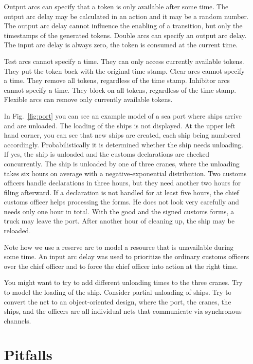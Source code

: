 Output arcs can specify that a token is only available
after some time. The output arc delay may be calculated in an action
and it may be a random number. The output arc delay cannot influence
the enabling of a transition, but only the timestamps of the
generated tokens.
Double arcs can specify an output arc delay. The input arc
delay is always zero, the token is consumed at the
current time.

Test arcs cannot specify a time. They can only access currently
available tokens. They put the token back with the original time stamp.
Clear arcs cannot specify a time. They remove all tokens,
regardless of the time stamp.
Inhibitor arcs cannot specify a time. They block on all tokens,
regardless of the time stamp.
Flexible arcs can remove only currently available tokens.


In Fig.~\ref{fig:port} you can see an example model of a
sea port where ships arrive and are unloaded. The loading of the
ships is not displayed. At the upper left hand corner, you can see
that new ships are created, each ship being numbered accordingly.
Probabilistically it is determined whether the ship needs unloading.
If yes, the ship is unloaded and the customs declarations are checked
concurrently. The ship is unloaded by one of three cranes, where
the unloading takes six hours on average with
a negative-exponential distribution. Two customs officers
handle declarations in three hours, but they need
another two hours for filing afterward. If a declaration is not
handled for at least five hours, the chief customs officer
helps processing the forms. He does not look very carefully
and needs only one hour in total. With the good and
the signed customs forms, a truck may leave the port.
After another hour of cleaning up, the ship may be reloaded.

Note how we use a reserve arc to model a resource that is
unavailable during some time. An input arc delay was used to prioritize
the ordinary customs officers over the chief officer and
to force the chief officer into action at the right time.

You might want to try to add different unloading times to the three
cranes. Try to model the loading of the ship.
Consider partial unloading of ships. Try to convert the
net to an object-oriented design, where the port, the cranes,
the ships, and the officers are all individual nets that communicate
via synchronous channels.

\section{Pitfalls}


